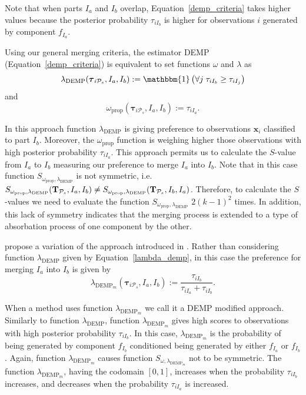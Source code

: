 \documentclass[submit]{smj}
\theoremstyle{definition}
\newcommand{\m}[1]{\boldsymbol{#1}}
\begin{document}
Note that when parts $I_a$ and $I_b$ overlap, Equation~\ref{demp_criteria} takes higher values because the posterior probability $\tau_{i I_b}$ is higher for observations $i$ generated by component $f_{I_a}$.

Using our general merging criteria, the estimator DEMP (Equation~\ref{demp_criteria}) is equivalent to set functions $\omega$ and $\lambda$ as 
\begin{equation}\label{lambda_demp}
\lambda_{\text{DEMP}}(\m\tau_{i \mathcal{P}_s},  I_a,  I_b) := \mathbbm{1}\left( \forall j\; \tau_{i I_{b}} \geq \tau_{iI_j} \right)
\end{equation}
and
\[
\omega_{\text{prop}}(\m\tau_{i \mathcal{P}_s},  I_a,  I_b) :=  \tau_{iI_a}.
\]

In this approach function $\lambda_{\text{DEMP}}$ is giving preference to observations $\m x_i$ classified to part $I_b$. Moreover, the $\omega_{\text{prop}}$ function is weighing higher those observations with high posterior probability $\tau_{iI_a}$. This approach permits us to calculate the $S$-value from $I_a$ to $I_b$ measuring our preference to merge $I_a$ into $I_b$. Note that in this case function  $S_{\omega_{\text{prop}}, \lambda_\text{DEMP}}$ is not symmetric, i.e. $S_{\omega_{\text{prop}}, \lambda_\text{DEMP}}(\text{\textbf{T}}_{\mathcal{P}_s},  I_a,  I_b) \neq S_{\omega_{\text{prop}}, \lambda_\text{DEMP}}(\text{\textbf{T}}_{\mathcal{P}_s},  I_b,  I_a)$. Therefore, to calculate the $S$-values we need to evaluate the function $S_{\omega_{\text{prop}}, \lambda_\text{DEMP}}$ $2 (k-1)^2$ times. In addition, this lack of symmetry indicates that the merging process is extended to a type of absorbation process of one component by the other.

\cite{longford2014} propose a variation of the approach introduced in \cite{hennig2010methods}. Rather than considering function $\lambda_{\text{DEMP}}$ given by Equation~\ref{lambda_demp}, in this case the preference for merging $I_a$ into $I_b$ is given by
\begin{equation}\label{lambda_dempM}
\lambda_{\text{DEMP}_m}(\m\tau_{i \mathcal{P}_s},  I_a,  I_b) := \frac{\tau_{iI_b}}{\tau_{iI_a} + \tau_{iI_b}}.
\end{equation} 


When a method uses function $\lambda_{\text{DEMP}_m}$ we call it a DEMP modified approach. Similarly to function $\lambda_{\text{DEMP}}$, function $\lambda_{\text{DEMP}_m}$ gives high scores to observations with high posterior probability $\tau_{iI_b}$. In this case, $\lambda_{\text{DEMP}_m}$ is the probability of being generated by component $f_{I_b}$ conditioned being generated by either $f_{I_a}$ or $f_{I_b}$. Again, function $\lambda_{\text{DEMP}_m}$ causes function $S_{\omega, \lambda_{\text{DEMP}_m}}$ not to be symmetric. The function $\lambda_{\text{DEMP}_m}$, having the codomain $[0,1]$, increases when the probability $\tau_{iI_b}$ increases, and decreases when the probability $\tau_{iI_a}$ is increased. 
\end{document}
